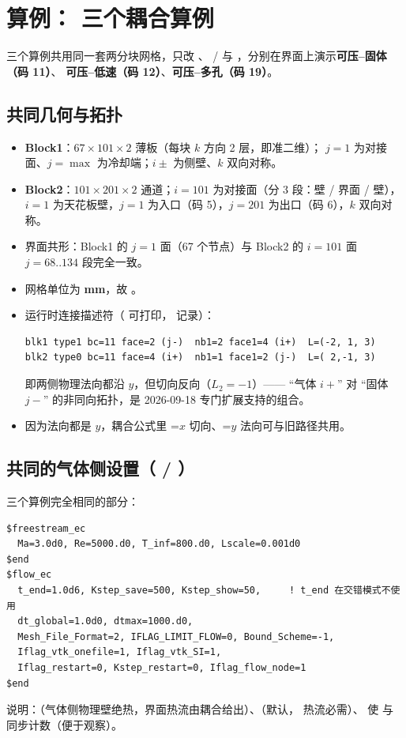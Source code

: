 \section{算例： 三个耦合算例}
\label{sec:cases}

三个算例共用同一套两分块网格，只改 、 /
 与 ，分别在界面上演示\textbf{可压--固体（码 11）}、
\textbf{可压--低速（码 12）}、\textbf{可压--多孔（码 19）}。

\subsection{共同几何与拓扑}
\begin{itemize}
  \item \textbf{Block1}：$67\times101\times2$ 薄板（每块 $k$ 方向 2 层，即准二维）；
        $j=1$ 为对接面、$j=\max$ 为冷却端；$i\pm$ 为侧壁、$k$ 双向对称。
  \item \textbf{Block2}：$101\times201\times2$ 通道；$i=101$ 为对接面（分 3 段：壁 / 界面 / 壁），
        $i=1$ 为天花板壁，$j=1$ 为入口（码 5），$j=201$ 为出口（码 6），$k$ 双向对称。
  \item 界面共形：Block1 的 $j=1$ 面（67 个节点）与 Block2 的 $i=101$ 面 $j=68..134$ 段完全一致。
  \item 网格单位为 \textbf{mm}，故 。
  \item 运行时连接描述符（ 可打印， 记录）：
\begin{lstlisting}
blk1 type1 bc=11 face=2 (j-)  nb1=2 face1=4 (i+)  L=(-2, 1, 3)
blk2 type0 bc=11 face=4 (i+)  nb1=1 face1=2 (j-)  L=( 2,-1, 3)
\end{lstlisting}
        即两侧物理法向都沿 $y$，但切向反向（$L_2=-1$）——
        “气体 $i+$” 对 “固体 $j-$” 的非同向拓扑，是 2026-09-18 专门扩展支持的组合。
  \item 因为法向都是 $y$，耦合公式里 =$x$ 切向、=$y$ 法向可与旧路径共用。
\end{itemize}

\subsection{共同的气体侧设置（ / ）}
三个算例完全相同的部分：
\begin{lstlisting}
$freestream_ec
  Ma=3.0d0, Re=5000.d0, T_inf=800.d0, Lscale=0.001d0
$end
$flow_ec
  t_end=1.0d6, Kstep_save=500, Kstep_show=50,     ! t_end 在交错模式不使用
  dt_global=1.0d0, dtmax=1000.d0,
  Mesh_File_Format=2, IFLAG_LIMIT_FLOW=0, Bound_Scheme=-1,
  Iflag_vtk_onefile=1, Iflag_vtk_SI=1,
  Iflag_restart=0, Kstep_restart=0, Iflag_flow_node=1
$end
\end{lstlisting}
说明：（气体侧物理壁绝热，界面热流由耦合给出）、（默认，
热流必需）、 使  与  同步计数（便于观察）。

